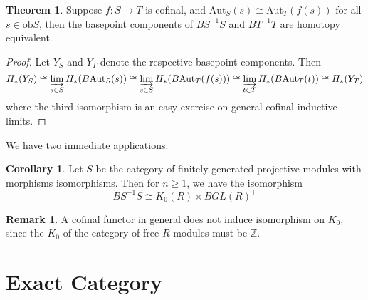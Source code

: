 \documentclass{article}
\theoremstyle{definition}
\newtheorem{theorem}{Theorem}[section]
\theoremstyle{definition}
\theoremstyle{definition}
\newtheorem{remark}{Remark}[theorem]
\theoremstyle{definition}
\theoremstyle{definition}
\theoremstyle{definition}
\newtheorem{corollary}{Corollary}[theorem]
\theoremstyle{definition}
\begin{document}
\begin{tcolorbox}[colback=red!5!white,colframe=red!30!white]
\begin{theorem}
Suppose $f: S\to T$ is cofinal, and $\textrm{Aut}_S(s)\cong \textrm{Aut}_T(f(s))$ for all $s\in \textrm{ob}S$, then the basepoint components of $BS^{-1}S$ and $BT^{-1}T$ are homotopy equivalent.  
\end{theorem}
\end{tcolorbox}
\begin{proof}
    Let $Y_S$ and $Y_T$ denote the respective basepoint components. Then 
    \[H_*(Y_S)\cong \varinjlim_{s\in S}H_*(B \textrm{Aut}_S(s))\cong \varinjlim_{s\in S}H_*(B \textrm{Aut}_T(f(s)))\cong \varinjlim_{t\in T}H_*(B \textrm{Aut}_T(t))\cong H_*(Y_T)\]
    where the third isomorphism is an easy exercise on general cofinal inductive limits.
\end{proof}
We have two immediate applications:
\begin{tcolorbox}[colback=green!5!white,colframe=green!30!white]
\begin{corollary}
Let $S$ be the category of finitely generated projective modules with morphisms isomorphisms. Then for $n\geq 1$, we have the isomorphism 
\[BS^{-1}S\cong K_0(R)\times BGL(R)^+\]
\end{corollary}
\end{tcolorbox}

\begin{tcolorbox}[colback=green!5!white,colframe=green!30!white]
\begin{remark}
A cofinal functor in general does not induce isomorphism on $K_0$, since the $K_0$ of the category of free $R$ modules must be $\mathbb{Z}$.
\end{remark}
\end{tcolorbox}


\section{Exact Category}
\end{document}
